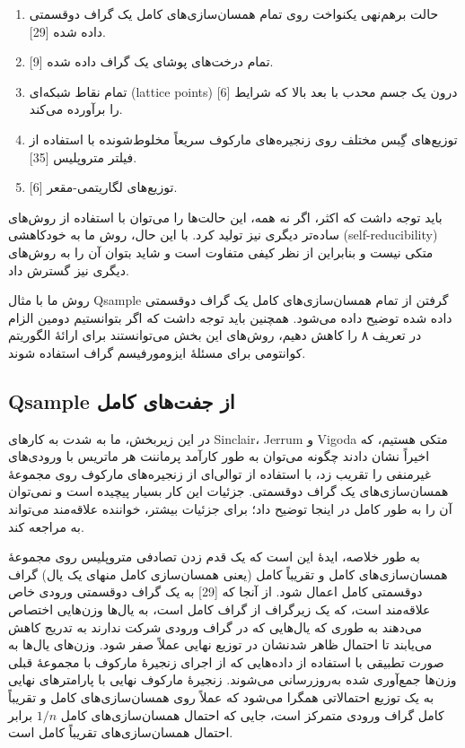 \begin{enumerate}
	\item حالت برهم‌نهی یکنواخت روی تمام همسان‌سازی‌های کامل یک گراف دو‌قسمتی داده شده [29].
	\item تمام درخت‌های پوشای یک گراف داده شده [9].
	\item تمام نقاط شبکه‌ای (lattice points) درون یک جسم محدب با بعد بالا که شرایط [6] را برآورده می‌کند.
	\item توزیع‌های گِبس مختلف روی زنجیره‌های مارکوف سریعاً مخلوط‌شونده با استفاده از فیلتر متروپلیس [35].
	\item توزیع‌های لگاریتمی-مقعر [6].
\end{enumerate}
باید توجه داشت که اکثر، اگر نه همه، این حالت‌ها را می‌توان با استفاده از روش‌های ساده‌تر دیگری نیز تولید کرد. با این حال، روش ما به خودکاهشی (self-reducibility) متکی نیست و بنابراین از نظر کیفی متفاوت است و شاید بتوان آن را به روش‌های دیگری نیز گسترش داد.  

روش ما با مثال Qsample گرفتن از تمام همسان‌سازی‌های کامل یک گراف دو‌قسمتی داده شده توضیح داده می‌شود. همچنین باید توجه داشت که اگر بتوانستیم دومین الزام در تعریف ۸ را کاهش دهیم، روش‌های این بخش می‌توانستند برای ارائهٔ الگوریتم کوانتومی برای مسئلهٔ ایزومورفیسم گراف استفاده شوند.
\subsection{ Qsample از جفت‌های کامل}
در این زیر‌بخش، ما به شدت به کارهای Sinclair، Jerrum و Vigoda \cite{29} متکی هستیم، که اخیراً نشان دادند چگونه می‌توان به طور کارآمد پرماننت هر ماتریس با ورودی‌های غیرمنفی را تقریب زد، با استفاده از توالی‌ای از زنجیره‌های مارکوف روی مجموعهٔ همسان‌سازی‌های یک گراف دو‌قسمتی. جزئیات این کار بسیار پیچیده است و نمی‌توان آن را به طور کامل در اینجا توضیح داد؛ برای جزئیات بیشتر، خواننده علاقه‌مند می‌تواند به \cite{29} مراجعه کند.  

به طور خلاصه، ایدهٔ \cite{29} این است که یک قدم زدن تصادفی متروپلیس  روی مجموعهٔ همسان‌سازی‌های کامل و تقریباً کامل (یعنی همسان‌سازی کامل منهای یک یال) گراف دو‌قسمتی کامل اعمال شود. از آنجا که [29] به یک گراف دو‌قسمتی ورودی خاص علاقه‌مند است، که یک زیرگراف از گراف کامل است، به یال‌ها وزن‌هایی اختصاص می‌دهند به طوری که یال‌هایی که در گراف ورودی شرکت ندارند به تدریج کاهش می‌یابند تا احتمال ظاهر شدنشان در توزیع نهایی عملاً صفر شود. وزن‌های یال‌ها به صورت تطبیقی با استفاده از داده‌هایی که از اجرای زنجیرهٔ مارکوف با مجموعهٔ قبلی وزن‌ها جمع‌آوری شده به‌روزرسانی می‌شوند. زنجیرهٔ مارکوف نهایی با پارامترهای نهایی به یک توزیع احتمالاتی همگرا می‌شود که عملاً روی همسان‌سازی‌های کامل و تقریباً کامل گراف ورودی متمرکز است، جایی که احتمال همسان‌سازی‌های کامل $1/n$ برابر احتمال همسان‌سازی‌های تقریباً کامل است.  


